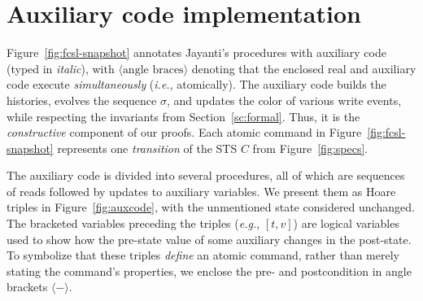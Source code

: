 \documentclass[a4paper,UKenglish]{lipics-v2016}
\newcommand{\ie}{\emph{i.e.}\xspace}
\newcommand{\eg}{\emph{e.g.}\xspace}
\def\ordlist{\sigma}
\theoremstyle{definition}
\begin{document}
\section{Auxiliary code implementation}
\label{sc:implementation}

Figure~\ref{fig:fcsl-snapshot} annotates Jayanti's procedures with
auxiliary code (typed in \emph{italic}), with $\langle\mbox{angle
braces}\rangle$ denoting that the enclosed real and auxiliary code
execute \emph{simultaneously} (\ie, atomically). The auxiliary code
builds the histories, evolves the sequence $\ordlist$, and updates the
color of various write events, while respecting the invariants from
Section~\ref{sc:formal}. Thus, it is the \emph{constructive} component
of our proofs. Each atomic command in Figure~\ref{fig:fcsl-snapshot}
represents one \emph{transition} of the STS $C$ from
Figure~\ref{fig:specs}.

%
%
%

The auxiliary code is divided into several procedures, all of which
are sequences of reads followed by updates to auxiliary variables. We
present them as Hoare triples in Figure~\ref{fig:auxcode}, with the
unmentioned state considered unchanged. The bracketed variables
preceding the triples (\eg, $[t, v]$) are logical variables used to
show how the pre-state value of some auxiliary changes in the
post-state. To symbolize that these triples \emph{define} an atomic
command, rather than merely stating the command's properties, we
enclose the pre- and postcondition in angle brackets $\langle
- \rangle$.

%

\end{document}
